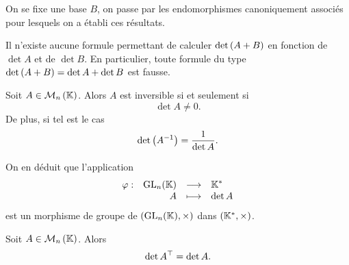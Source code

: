 \documentclass{magnolia}
\begin{document}
\begin{preuve}
On se fixe une base $B$, on passe par les endomorphismes canoniquement associés pour lesquels on a établi ces résultats.
\end{preuve}

\begin{remarqueUnique}
\remarque Il n'existe aucune formule permettant de calculer
  $\mathop{\rm det}\left(A+B\right)$ en fonction de $\det A$ et de $\det B$. En particulier, toute
  formule du type $\mathop{\rm det}\left(A+B\right)=\mathop{\rm det} A+\mathop{\rm det} B$ est fausse.
\end{remarqueUnique}

\begin{proposition}
Soit $A\in\mathcal{M}_{n}\left(\mathbb{K}\right)$. Alors $A$ est inversible si et seulement si
\[\det A\neq 0.\]
De plus, si tel est le cas
\[\mathop{\rm det}\left(A^{-1}\right)=\frac{1}{\mathop{\rm det} A}.\]
\end{proposition}


\begin{remarqueUnique}
\remarque On en déduit que l'application
  \[\begin{array}[t]{lrcl} \displaystyle{\varphi} : & \displaystyle{{\rm GL}_n(\ensuremath{\mathbb{K}})} & \longrightarrow & \displaystyle{\ensuremath{\mathbb{K}^*}} \\ & \displaystyle{A} & \longmapsto & \displaystyle{\mathop{\rm det}A} \end{array}\]
  est un morphisme de groupe de $({\rm GL}_{n}(\mathbb{K}),\times)$ dans $(\mathbb{K}^*,\times)$.
\end{remarqueUnique}

\begin{proposition}
Soit $A\in\mathcal{M}_{n}\left(\mathbb{K}\right)$. Alors
\[\mathop{\rm det}{A}^{\top}=\mathop{\rm det} A.\]
\end{proposition}
\end{document}
